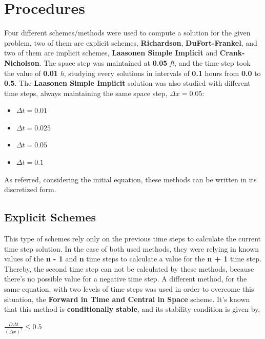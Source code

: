\documentclass[12pt]{report}
\begin{document}
\section*{Procedures}
Four different schemes/methods were used to compute a solution for the given problem, two of them are explicit schemes, \textbf{Richardson}, \textbf{DuFort-Frankel}, and two of them are implicit schemes, \textbf{Laasonen Simple Implicit} and \textbf{Crank-Nicholson}. The space step was maintained at \textbf{0.05} \textit{ft}, and the time step took the value of \textbf{0.01} \textit{h}, studying every solutions in intervals of \textbf{0.1} hours from \textbf{0.0} to \textbf{0.5}. The \textbf{Laasonen Simple Implicit} solution was also studied with different time steps, always maintaining the same space step,  \textbf{$\Delta x = 0.05$}:
\begin{itemize}[noitemsep] 
\item $ \Delta t = 0.01 $
\item $ \Delta t = 0.025 $
\item $ \Delta t = 0.05 $
\item $ \Delta t = 0.1 $
\end{itemize}
As referred, considering the initial equation, these methods can be written in its discretized form.

\subsection*{Explicit Schemes}

\par This type of schemes rely only on the previous time steps to calculate the current time step solution. In the case of both used methods, they were relying in known values of the \textbf{n - 1} and \textbf{n} time steps to calculate a value for the \textbf{n + 1} time step. Thereby, the second time step can not be calculated by these methods, because there's no possible value for a negative time step. A different method, for the same equation, with two levels of time steps was used in order to overcome this situation, the \textbf{Forward in Time and Central in Space} scheme. It's known that this method is \textbf{conditionally stable}, and its stability condition is given by,

\begin{center}
\Large
$
\frac{D \Delta t}{(\Delta x)^2} \leq 0.5
$
\end{center}
\end{document}
